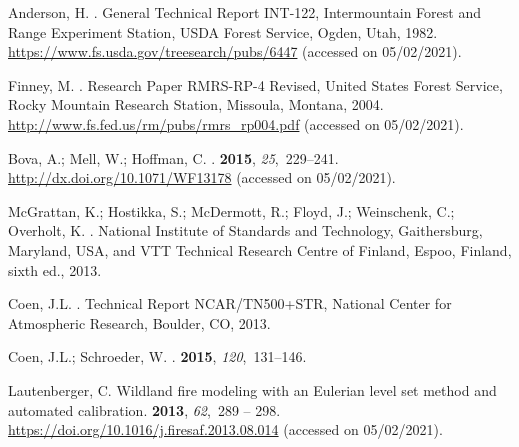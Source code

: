 \documentclass[atmosphere,article,accept,moreauthors,pdftex]{Definitions/mdpi}
\begin{document}
\begin{thebibliography}{999}
Anderson, H.
.
\newblock General Technical Report INT-122, Intermountain Forest and Range
  Experiment Station, USDA Forest Service, Ogden, Utah,  1982.
\newblock
  \href{https://www.fs.usda.gov/treesearch/pubs/6447}{https://www.fs.usda.gov/treesearch/pubs/6447} (accessed on 05/02/2021).

Finney, M.
.
\newblock Research Paper RMRS-RP-4 Revised, United States Forest Service, Rocky
  Mountain Research Station, Missoula, Montana,  2004.
\newblock
  \href{http://www.fs.fed.us/rm/pubs/rmrs\_rp004.pdf}{http://www.fs.fed.us/rm/pubs/rmrs\_rp004.pdf} (accessed on 05/02/2021).

Bova, A.; Mell, W.; Hoffman, C.
.
 {\bf 2015}, {\em
  25},~229--241.
\newblock
  \href{http://dx.doi.org/10.1071/WF13178}{http://dx.doi.org/10.1071/WF13178} (accessed on 05/02/2021).

McGrattan, K.; Hostikka, S.; McDermott, R.; Floyd, J.; Weinschenk, C.;
  Overholt, K.
.
\newblock National Institute of Standards and Technology, Gaithersburg,
  Maryland, USA, and VTT Technical Research Centre of Finland, Espoo, Finland,
  sixth ed.,  2013.

Coen, J.L.
.
\newblock Technical Report NCAR/TN500+STR, National Center for Atmospheric
  Research, Boulder, CO,  2013.

Coen, J.L.; Schroeder, W.
.
 {\bf 2015}, {\em 120},~131--146.

Lautenberger, C.
\newblock Wildland fire modeling with an Eulerian level set method and
  automated calibration.
 {\bf 2013}, {\em 62},~289 -- 298.
\newblock
  \href{https://doi.org/10.1016/j.firesaf.2013.08.014}{https://doi.org/10.1016/j.firesaf.2013.08.014} (accessed on 05/02/2021).


\end{thebibliography}
\end{document}
